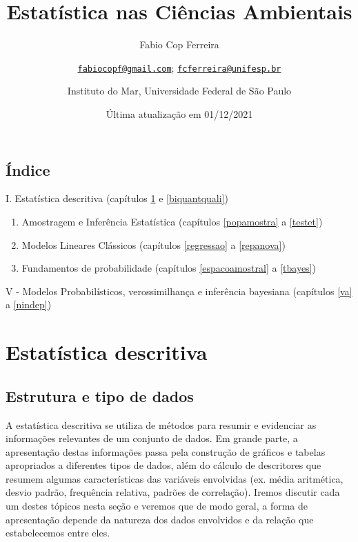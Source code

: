 \documentclass[
]{book}
\title{Estatística nas Ciências Ambientais}
\author{Fabio Cop Ferreira \and \href{mailto:fabiocopf@gmail.com}{\nolinkurl{fabiocopf@gmail.com}}; \href{mailto:fcferreira@unifesp.br}{\nolinkurl{fcferreira@unifesp.br}} \and Instituto do Mar, Universidade Federal de São Paulo}
\date{Última atualização em 01/12/2021}
\begin{document}
\maketitle

{
\setcounter{tocdepth}{1}
\tableofcontents
}
\hypertarget{uxedndice}{%
\chapter*{Índice}\label{uxedndice}}

I. Estatística descritiva (capítulos \ref{estrdados} e \ref{biquantquali})

\begin{enumerate}
\def\labelenumi{\Roman{enumi}.}
\setcounter{enumi}{1}
\item
  Amostragem e Inferência Estatística (capítulos \ref{popamostra} a \ref{testet})
\item
  Modelos Lineares Clássicos (capítulos \ref{regressao} a \ref{repanova})
\item
  Fundamentos de probabilidade (capítulos \ref{espacoamostral} a \ref{tbayes})
\end{enumerate}

V - Modelos Probabilísticos, verossimilhança e inferência bayesiana (capítulos \ref{va} a \ref{nindep})

\hypertarget{part-estatuxedstica-descritiva}{%
\part{Estatística descritiva}\label{part-estatuxedstica-descritiva}}

\hypertarget{estrdados}{%
\chapter{Estrutura e tipo de dados}\label{estrdados}}

A estatística descritiva se utiliza de métodos para resumir e evidenciar as informações relevantes de um conjunto de dados. Em grande parte, a apresentação destas informações passa pela construção de gráficos e tabelas apropriados a diferentes tipos de dados, além do cálculo de descritores que resumem algumas características das variáveis envolvidas (ex. média aritmética, desvio padrão, frequência relativa, padrões de correlação). Iremos discutir cada um destes tópicos nesta seção e veremos que de modo geral, a forma de apresentação depende da natureza dos dados envolvidos e da relação que estabelecemos entre eles.
\end{document}
